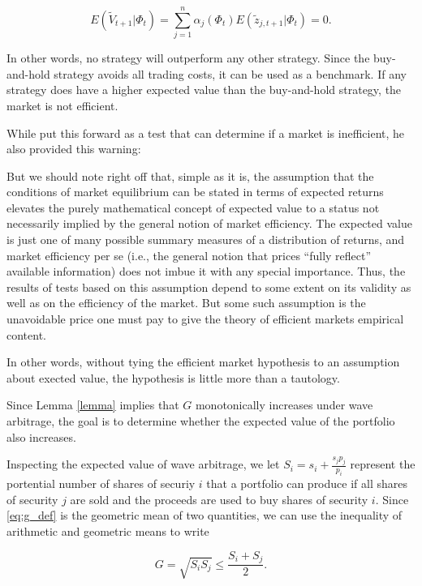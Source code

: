 \documentclass{article}
\begin{document}
\begin{equation}
\label{eq:excess_returns}
  E(\tilde{V}_{t+1} | \Phi_t)
    = \sum_{j=1}^n \alpha_j (\Phi_t) E(\tilde{z}_{j,t+1} | \Phi_t)
    = 0.
\end{equation}

In other words, no strategy will outperform any other strategy. Since the
buy-and-hold strategy avoids all trading costs, it can be used as a benchmark.
If any strategy does have a higher expected value than the buy-and-hold
strategy, the market is not efficient.

While \citet{fama1970} put this forward as a test that can determine if a
market is inefficient, he also provided this warning:

\begin{displayquote}
  But we should note right off that, simple as it is, the assumption that the
  conditions of market equilibrium can be stated in terms of expected returns
  elevates the purely mathematical concept of expected value to a status not
  necessarily implied by the general notion of market efficiency. The expected
  value is just one of many possible summary measures of a distribution of
  returns, and market efficiency per se (i.e., the general notion that prices
  ``fully reflect'' available information) does not imbue it with any special
  importance. Thus, the results of tests based on this assumption depend to
  some extent on its validity as well as on the efficiency of the market. But
  some such assumption is the unavoidable price one must pay to give the theory
  of efficient markets empirical content.
\end{displayquote}

In other words, without tying the efficient market hypothesis to an assumption
about exected value, the hypothesis is little more than a tautology.

Since Lemma \ref{lemma} implies that ${G}$ monotonically increases under wave
arbitrage, the goal is to determine whether the expected value of the portfolio
also increases.

Inspecting the expected value of wave arbitrage, we let
$S_i = s_i + \frac{s_j p_j}{p_i}$ represent the portential number of shares of
securiy $i$ that a portfolio can produce if all shares of security $j$ are sold
and the proceeds are used to buy shares of security $i$. Since \ref{eq:g_def}
is the geometric mean of two quantities, we can use the inequality of
arithmetic and geometric means to write

\begin{equation}
  G = \sqrt{S_i S_j} \leq \frac{S_i + S_j}{2}.
\end{equation}
\end{document}
